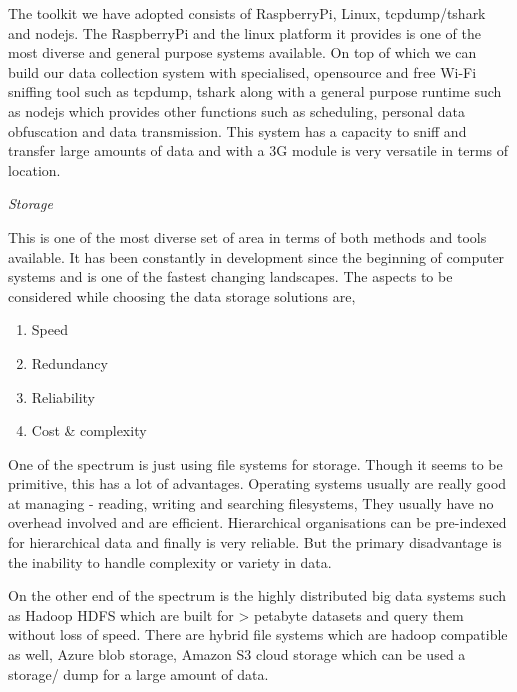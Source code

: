 The toolkit we have adopted consists of RaspberryPi, Linux, tcpdump/tshark and nodejs.
The RaspberryPi and the linux platform it provides is one of the most diverse and general purpose systems available.
On top of which we can build our data collection system with specialised, opensource and free Wi-Fi sniffing tool such as tcpdump, tshark along with a general purpose runtime such as nodejs which provides other functions such as scheduling, personal data obfuscation and data transmission.
This system has a capacity to sniff and transfer large amounts of data and with a 3G module is very versatile in terms of location.


\vspace{1.5em}\noindent\textit{Storage}\vspace{0.5em}

This is one of the most diverse set of area in terms of both methods and tools available.
It has been constantly in development since the beginning of computer systems and is one of the fastest changing landscapes.
The aspects to be considered while choosing the data storage solutions are,

\begin{enumerate}
    \item Speed
    \item Redundancy
    \item Reliability
    \item Cost \& complexity
\end{enumerate}

One of the spectrum is just using file systems for storage.
Though it seems to be primitive, this has a lot of advantages.
Operating systems usually are really good at managing - reading, writing and searching filesystems, They usually have no overhead involved and are efficient.
Hierarchical organisations can be pre-indexed for hierarchical data and finally is very reliable.
But the primary disadvantage is the inability to handle complexity or variety in data.

On the other end of the spectrum is the highly distributed big data systems such as Hadoop HDFS which are built for > petabyte datasets and query them without loss of speed.
There are hybrid file systems which are hadoop compatible as well, Azure blob storage, Amazon S3 cloud storage which can be used a storage/ dump for a large amount of data.

